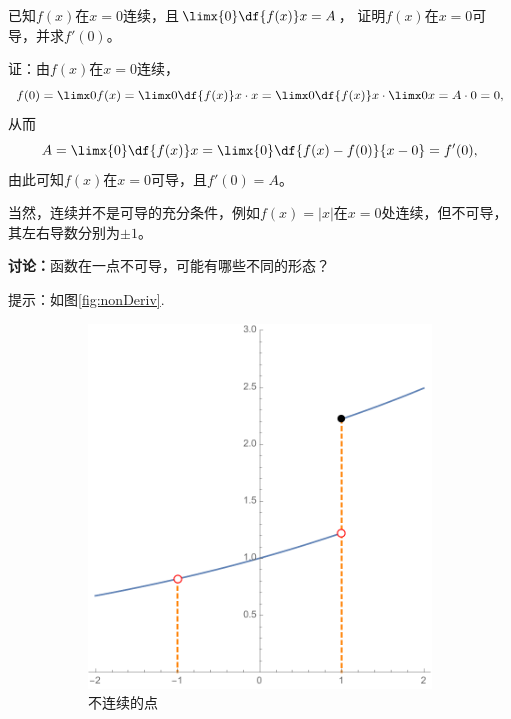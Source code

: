\bs
\egz 已知$f(x)$在$x=0$连续，且$\limx{0}\df{f(x)}x=A$，
证明$f(x)$在$x=0$可导，并求$f'(0)$。

证：由$f(x)$在$x=0$连续，
$$f(0)=\limx0f(x)=\limx0\df{f(x)}x\cdot x
=\limx0\df{f(x)}x\cdot\limx0x=A\cdot 0=0,$$
从而
$$A=\limx{0}\df{f(x)}x=\limx{0}\df{f(x)-f(0)}{x-0}=f'(0),$$
由此可知$f(x)$在$x=0$可导，且$f'(0)=A$。
\fin

\bs
当然，连续并不是可导的充分条件，例如$f(x)=|x|$在$x=0$处连续，但不可导，
其左右导数分别为$\pm 1$。

\bs
{\bf 讨论：}函数在一点不可导，可能有哪些不同的形态？

\ifhint
提示：如图\ref{fig:nonDeriv}.
\begin{figure}[h]
	\centering
	\begin{subfigure}[t]{0.3\textwidth}
		\centering
		\includegraphics[width=\textwidth]
		{./images/ch02/nonCont.pdf}
		\caption{不连续的点}
	\end{subfigure}\;\;
	\begin{subfigure}[t]{0.3\textwidth}
		\centering

\end{subfigure}
\end{figure}
